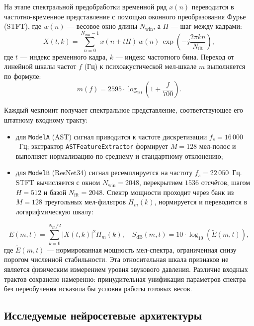\documentclass[pdflatex,sn-mathphys-num]{sn-jnl}
\begin{document}
На этапе спектральной предобработки временной ряд $x(n)$ переводится в частотно-временное представление с помощью оконного преобразования Фурье (STFT), где $w(n)$ --- весовое окно длины $N_{\text{win}}$, а $H$ --- шаг между кадрами:
\begin{equation}\label{eq:stft}
    X(t, k) = \sum_{n=0}^{N_{\text{win}}-1} x(n + tH)\, w(n)\, \exp\!\left(-j \frac{2\pi k n}{N_{\text{fft}}}\right),
\end{equation}
где $t$ --- индекс временного кадра, $k$ --- индекс частотного бина. Переход от линейной шкалы частот $f$ (Гц) к психоакустической мел-шкале $m$ выполняется по формуле:
\begin{equation}\label{eq:mel}
    m(f) = 2595 \cdot \log_{10}\!\left(1 + \frac{f}{700}\right).
\end{equation}

Каждый чекпоинт получает спектральное представление, соответствующее его штатному входному тракту:
\begin{itemize}
    \item для \texttt{ModelA} (AST) сигнал приводится к частоте дискретизации $f_s = 16\,000$~Гц; экстрактор \texttt{ASTFeatureExtractor} формирует $M = 128$ мел-полос и выполняет нормализацию по среднему и стандартному отклонению;
    \item для \texttt{ModelB} (ResNet34) сигнал ресемплируется на частоту $f_s = 22\,050$~Гц. STFT вычисляется с окном $N_{\text{win}} = 2048$, перекрытием $1536$ отсчётов, шагом $H = 512$ и базой $N_{\text{fft}} = 2048$. Спектр мощности проходит через банк из $M = 128$ треугольных мел-фильтров $H_m(k)$, нормируется и переводится в логарифмическую шкалу:
\end{itemize}
\begin{equation}\label{eq:logmel}
    E(m, t) = \sum_{k=0}^{N_{\text{fft}}/2} |X(t, k)|^2 H_m(k), \quad
    S_{\text{dB}}(m, t) = 10 \cdot \log_{10}\!\left(\tilde{E}(m, t)\right),
\end{equation}
где $\tilde{E}(m, t)$ --- нормированная мощность мел-спектра, ограниченная снизу порогом численной стабильности. Эта относительная шкала признаков не является физическим измерением уровня звукового давления. Различие входных трактов сохранено намеренно: принудительная унификация параметров спектра без переобучения исказила бы условия работы готовых весов.

\subsection{Исследуемые нейросетевые архитектуры}
\end{document}
